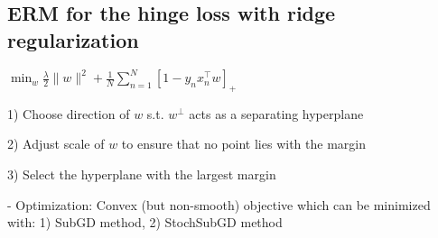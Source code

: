 











\subsection*{ERM for the hinge loss with ridge regularization}

$
\min _{w} \frac{\lambda}{2}\|w\|^{2}+\frac{1}{N} \sum_{n=1}^{N}\left[1-y_{n} x_{n}^{\top} w\right]_{+}
$


1) Choose direction of $w$ s.t. $w^{\perp}$ acts as a separating hyperplane

2) Adjust scale of $w$ to ensure that no point lies with the margin

3) Select the hyperplane with the largest margin

- Optimization:
Convex (but non-smooth) objective which can be minimized with: 1) SubGD method, 2) StochSubGD method

